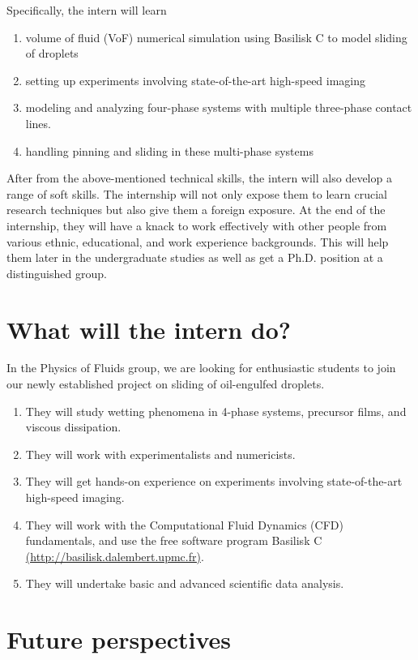 \documentclass[a4paper,10pt]{article}
\begin{document}
\noindent Specifically, the intern will learn

\begin{enumerate}
	\item volume of fluid (VoF) numerical simulation using Basilisk C to model sliding of droplets
	\item setting up experiments involving state-of-the-art high-speed imaging
	\item modeling and analyzing four-phase systems with multiple three-phase contact lines. 
	\item handling pinning and sliding in these multi-phase systems
\end{enumerate}


\noindent After from the above-mentioned technical skills, the intern will also develop a range of soft skills. The internship will not only expose them to learn crucial research techniques but also give them a foreign exposure. At the end of the internship, they will have a knack to work effectively with other people from various ethnic, educational, and work experience backgrounds. This will help them later in the undergraduate studies as well as get a Ph.D. position at a distinguished group.

\section*{What will the intern do?}
In the Physics of Fluids group, we are looking for enthusiastic students to join our newly established project on sliding of oil-engulfed droplets.
\begin{enumerate}
	\item They will study wetting phenomena in 4-phase systems, precursor films, and viscous dissipation. 
	\item They will work with experimentalists and numericists. 
	\item They will get hands-on experience on experiments involving state-of-the-art high-speed imaging.
	\item They will work with the Computational Fluid Dynamics (CFD) fundamentals, and use the free software program Basilisk C \href{http://basilisk.dalembert.upmc.fr}{(http://basilisk.dalembert.upmc.fr)}.
	\item They will undertake basic and advanced scientific data analysis.
\end{enumerate}

\section*{Future perspectives}
\end{document}

